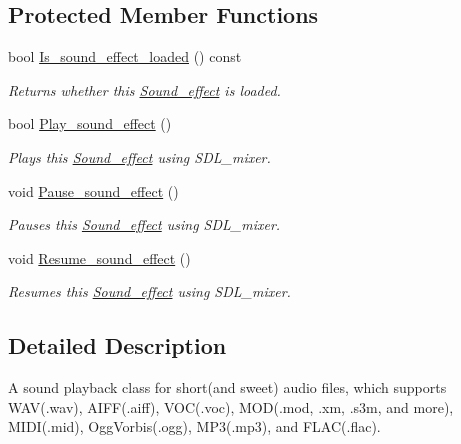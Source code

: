 \subsection*{Protected Member Functions}
\begin{DoxyCompactItemize}
\item 
bool \hyperlink{classjetfuel_1_1media_1_1Sound__effect_a6f646b304bc3617e027a4d503e4124db}{Is\+\_\+sound\+\_\+effect\+\_\+loaded} () const
\begin{DoxyCompactList}\small\item\em Returns whether this \hyperlink{classjetfuel_1_1media_1_1Sound__effect}{Sound\+\_\+effect} is loaded. \end{DoxyCompactList}\item 
bool \hyperlink{classjetfuel_1_1media_1_1Sound__effect_abb1c6c0b2eba2d167b654af7cbcd6d24}{Play\+\_\+sound\+\_\+effect} ()
\begin{DoxyCompactList}\small\item\em Plays this \hyperlink{classjetfuel_1_1media_1_1Sound__effect}{Sound\+\_\+effect} using S\+D\+L\+\_\+mixer. \end{DoxyCompactList}\item 
void \hyperlink{classjetfuel_1_1media_1_1Sound__effect_a76b2b58d4ca2c1fe9988a4cdc4f96a3d}{Pause\+\_\+sound\+\_\+effect} ()
\begin{DoxyCompactList}\small\item\em Pauses this \hyperlink{classjetfuel_1_1media_1_1Sound__effect}{Sound\+\_\+effect} using S\+D\+L\+\_\+mixer. \end{DoxyCompactList}\item 
void \hyperlink{classjetfuel_1_1media_1_1Sound__effect_aa810e2cf5bd4f147b81755690c96f203}{Resume\+\_\+sound\+\_\+effect} ()
\begin{DoxyCompactList}\small\item\em Resumes this \hyperlink{classjetfuel_1_1media_1_1Sound__effect}{Sound\+\_\+effect} using S\+D\+L\+\_\+mixer. \end{DoxyCompactList}\end{DoxyCompactItemize}


\subsection{Detailed Description}
A sound playback class for short(and sweet) audio files, which supports W\+AV(.wav), A\+I\+FF(.aiff), V\+OC(.voc), M\+OD(.mod, .xm, .s3m, and more), M\+I\+DI(.mid), Ogg\+Vorbis(.ogg), M\+P3(.mp3), and F\+L\+AC(.flac).

